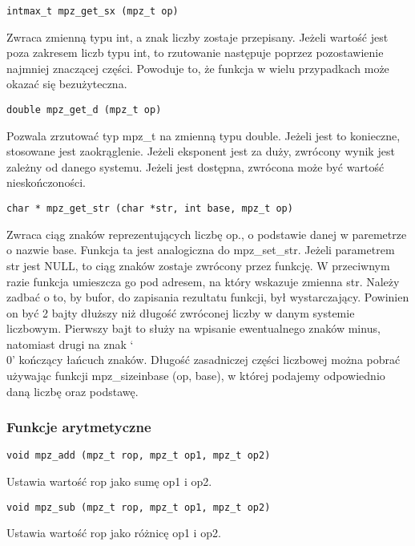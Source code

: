 \documentclass[twoside,a4paper]{book}
\begin{document}
\begin{lstlisting}
intmax_t mpz_get_sx (mpz_t op)
\end{lstlisting}
Zwraca zmienną typu int, a znak liczby zostaje przepisany. Jeżeli wartość jest poza zakresem liczb typu int, to rzutowanie następuje poprzez pozostawienie najmniej znaczącej części. Powoduje to, że funkcja w wielu przypadkach może okazać się bezużyteczna.

\begin{lstlisting}
double mpz_get_d (mpz_t op)
\end{lstlisting}
Pozwala zrzutować typ mpz\_t na zmienną typu double. Jeżeli jest to konieczne, stosowane jest zaokrąglenie. Jeżeli eksponent jest za duży, zwrócony wynik jest zależny od danego systemu. Jeżeli jest dostępna, zwrócona może być wartość nieskończoności.

\begin{lstlisting}
char * mpz_get_str (char *str, int base, mpz_t op)
\end{lstlisting}
Zwraca ciąg znaków reprezentujących liczbę op., o podstawie danej w paremetrze o nazwie base. Funkcja ta jest analogiczna do mpz\_set\_str. Jeżeli parametrem str jest NULL, to ciąg znaków zostaje zwrócony przez funkcję. W przeciwnym razie funkcja umieszcza go pod adresem, na który wskazuje zmienna str. Należy zadbać o to, by bufor, do zapisania rezultatu funkcji, był wystarczający. Powinien on być 2 bajty dłuższy niż długość zwróconej liczby w danym systemie liczbowym. Pierwszy bajt to służy na wpisanie ewentualnego znaków minus, natomiast drugi na znak ‘\\0’ kończący łańcuch znaków. Długość zasadniczej części liczbowej można pobrać używając funkcji mpz\_sizeinbase (op, base), w której podajemy odpowiednio daną liczbę oraz podstawę.

\subsubsection{Funkcje arytmetyczne}

\begin{lstlisting}
void mpz_add (mpz_t rop, mpz_t op1, mpz_t op2)
\end{lstlisting}
Ustawia wartość rop jako sumę op1 i op2.

\begin{lstlisting}
void mpz_sub (mpz_t rop, mpz_t op1, mpz_t op2)
\end{lstlisting}
Ustawia wartość rop jako różnicę op1 i op2.
\end{document}
